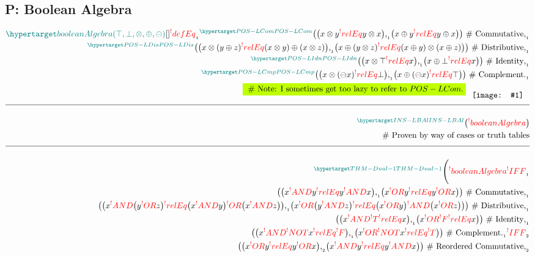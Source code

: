 \documentclass[a4paper]{article}
\makeatletter
\newcommand*{\img}[1]{\phantom{\_}%
    \raisebox{-0.5\baselineskip}{%
        \texttt{[image: \#1]}}\phantom{\_}}
\newcommand\rfrlist[1]{\forcsvlist{\rfrlist@item}{#1}}
\newcommand\rfrlist@item[1]{\rfr{#1}\\}
\newcommand{\thmlink}[2]{{}_{\substack{\rfrlist{#1}}}^{\dfn{#2}}}
\newcommand{\TODO}[1]{\colorbox{lime}{\text{#1}}}
\newcommand{\eqComment}[1]{\text{  \# #1}}
\newcommand{\n}{\\[1.5ex] \hline \nonumber \\[0ex]}
\newcommand{\m}{\nonumber \\}
\def\ml{\mleft}
\def\mr{\mright}
\newcommand{\cusand}{,}
\newcommand{\cusend}{.}
\newcommand{\cusnum}[2]{{#1}_{{\phantom{ }}_{#2}}}
\makeatother
\begin{document}
\subsection{P: Boolean Algebra}
\begin{tcolorbox}
\begin{align}
    \dfn{booleanAlgebra} [\ml(\top, \bot, \otimes, \oplus, \ominus\mr)][] \cusnum{\rfr{defEq}}{1} \thmlink{}{POS-LCom} \ml(\ml(x \otimes y \rfr{relEq} y \otimes x\mr) \cusnum{\cusand}{1} \ml(x \oplus y \rfr{relEq} y \oplus x\mr)\mr) \eqComment{Commutative} \cusnum{\cusand}{1}
\m \thmlink{}{POS-LDis} \ml(\ml(x \otimes \ml(y \oplus z\mr) \rfr{relEq} \ml(x \otimes y\mr) \oplus \ml(x \otimes z\mr)\mr) \cusnum{\cusand}{1} \ml(x \oplus \ml(y \otimes z\mr) \rfr{relEq} \ml(x \oplus y\mr) \otimes \ml(x \oplus z\mr)\mr)\mr) \eqComment{Distributive} \cusnum{\cusand}{1}
\m \thmlink{}{POS-LIdn} \ml(\ml(x \otimes \top \rfr{relEq} x\mr) \cusnum{\cusand}{1} \ml(x \oplus \bot \rfr{relEq} x\mr)\mr) \eqComment{Identity} \cusnum{\cusand}{1}
\m \thmlink{}{POS-LCmp} \ml(\ml(x \otimes \ml(\ominus x\mr) \rfr{relEq} \bot\mr) \cusnum{\cusand}{1} \ml(x \oplus \ml(\ominus x\mr) \rfr{relEq} \top\mr)\mr) \eqComment{Complement} \cusnum{\cusend}{1}
\m \TODO{\eqComment{Note: I sometimes get too lazy to refer to $POS-LCom$.}} \img{my-b.jpg} 
    \n \thmlink{}{INS-LBAl} \ml(\rfr{booleanAlgebra} [\rfr{T}, \rfr{F}, \rfr{AND}, \rfr{OR}, \rfr{NOT}][]\mr)
\m \eqComment{Proven by way of cases or truth tables}
    \n \thmlink{}{THM-Dual-1} \Bigg(\rfr{booleanAlgebra} [\ml(\rfr{T}, \rfr{F}, \rfr{AND}, \rfr{OR}, \rfr{NOT}\mr)][] \cusnum{\rfr{IFF}}{1}
\m \ml(\ml(x \rfr{AND} y \rfr{relEq} y \rfr{AND} x\mr) \cusnum{\cusand}{1} \ml(x \rfr{OR} y \rfr{relEq} y \rfr{OR} x\mr)\mr) \eqComment{Commutative} \cusnum{\cusand}{1}
\m \ml(\ml(x \rfr{AND} \ml(y \rfr{OR} z\mr) \rfr{relEq} \ml(x \rfr{AND} y\mr) \rfr{OR} \ml(x \rfr{AND} z\mr)\mr) \cusnum{\cusand}{1} \ml(x \rfr{OR} \ml(y \rfr{AND} z\mr) \rfr{relEq} \ml(x \rfr{OR} y\mr) \rfr{AND} \ml(x \rfr{OR} z\mr)\mr)\mr) \eqComment{Distributive} \cusnum{\cusand}{1}
\m \ml(\ml(x \rfr{AND} \rfr{T} \rfr{relEq} x\mr) \cusnum{\cusand}{1} \ml(x \rfr{OR} \rfr{F} \rfr{relEq} x\mr)\mr) \eqComment{Identity} \cusnum{\cusand}{1}
\m \ml(\ml(x \rfr{AND} \rfr{NOT} x \rfr{relEq} \rfr{F}\mr) \cusnum{\cusand}{1} \ml(x \rfr{OR} \rfr{NOT} x \rfr{relEq} \rfr{T}\mr)\mr) \eqComment{Complement} \cusnum{\cusend}{1} \cusnum{\rfr{IFF}}{2}
\m \ml(\ml(x \rfr{OR} y \rfr{relEq} y \rfr{OR} x\mr) \cusnum{\cusand}{2} \ml(x \rfr{AND} y \rfr{relEq} y \rfr{AND} x\mr)\mr) \eqComment{Reordered Commutative} \cusnum{\cusand}{2}

\end{align}
\end{tcolorbox}
\end{document}
